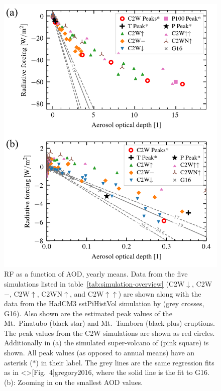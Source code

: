 \documentclass[draft]{agujournal2019}
\begin{document}
\begin{figure}
  \centering
  \includegraphics{figure2.png}

  \caption{RF as a function of AOD, yearly means. Data from the five simulations listed in
    table~\ref{tab:simulation-overview} (C2W\(\downarrow\), C2W\(-\), C2W\(\uparrow\),
    C2WN\(\uparrow\), and C2W\(\uparrow\uparrow\)) are shown along with the data from the
    HadCM3 sstPiHistVol simulation by  (grey crosses, G16). Also shown
    are the estimated peak values of the Mt.\ Pinatubo (black star) and Mt.\ Tambora (black
    plus) eruptions. The peak values from the C2W simulations are shown as red circles.
    Additionally in (a) the simulated super-volcano of  (pink square) is
    shown. All peak values (as opposed to annual means) have an asterisk (\(\ast{}\)) in
    their label. The grey lines are the same regression fits as in \citeA<>[Fig.\
      4]{gregory2016}, where the solid line is the fit to G16. (b): Zooming in on the smallest
    AOD values.}\label{fig:2_rf_vs_aod_slopes}%
\end{figure}
\end{document}

